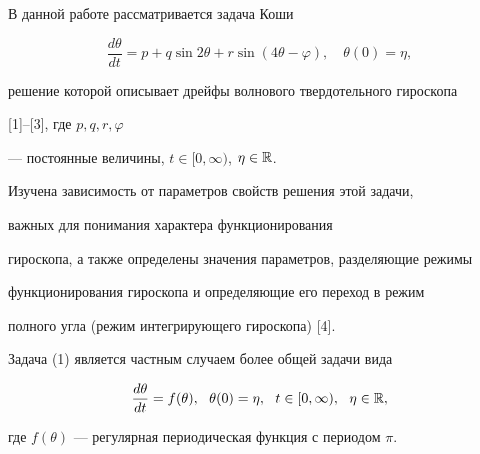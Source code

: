 \label{begin}











В данной работе рассматривается задача Коши


\begin{equation}


\frac{{d\theta}}{{dt}}=p+q\sin 2\theta+r\sin (4\theta - \varphi)


,\quad \theta (0)=\eta,


\end{equation}


решение которой описывает дрейфы волнового твердотельного гироскопа


[1]--[3], где $p,q,r,\varphi$


--- постоянные величины, $t \in [0,\infty)$, $\eta \in \Bbb R$.


Изучена зависимость от параметров свойств решения этой задачи,


важных для понимания характера функционирования


гироскопа, а также определены значения параметров, разделяющие режимы


функционирования гироскопа и определяющие его переход в режим


полного угла (режим интегрирующего гироскопа) [4].





Задача (1) является частным случаем более общей задачи вида


\begin{equation}


\frac{{d\theta}}{{dt}}=f(\theta),\ \ \theta (0)=\eta,


\ \ t \in [0, \infty), \ \ \eta \in \Bbb R,


\end{equation}


где $f(\theta)$ --- регулярная периодическая функция с периодом $\pi$.





